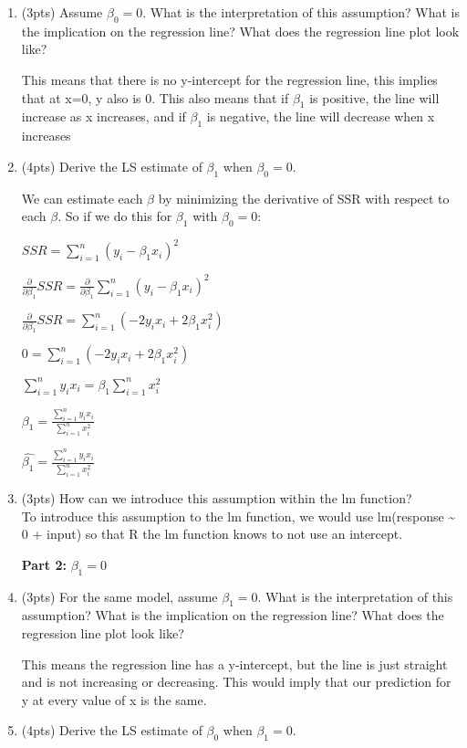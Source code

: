 \documentclass[
]{article}
\begin{document}
\begin{enumerate}
\def\labelenumi{(\alph{enumi})}
\item
  (3pts) Assume \(\beta_0=0\). What is the interpretation of this
  assumption? What is the implication on the regression line? What does
  the regression line plot look like?

  This means that there is no y-intercept for the regression line, this
  implies that at x=0, y also is 0. This also means that if \(\beta_1\)
  is positive, the line will increase as x increases, and if \(\beta_1\)
  is negative, the line will decrease when x increases
\item
  (4pts) Derive the LS estimate of \(\beta_1\) when \(\beta_0=0\).

  We can estimate each \(\beta\) by minimizing the derivative of SSR
  with respect to each \(\beta\). So if we do this for \(\beta_1\) with
  \(\beta_0=0\):

  \(SSR = \sum_{i=1}^{n}(y_i-\beta_1x_i)^2\)

  \(\frac{\partial}{\partial \beta_1} SSR = \frac{\partial}{\partial \beta_1} \sum_{i=1}^n(y_i-\beta_1x_i)^2\)

  \(\frac{\partial}{\partial \beta_1} SSR = \sum_{i=1}^n(-2y_ix_i+2\beta_1x_i^2)\)

  \(0=\sum_{i=1}^n(-2y_ix_i+2\beta_1x_i^2)\)

  \(\sum_{i=1}^ny_ix_i = \beta_1\sum_{i=1}^nx_i^2\)

  \(\beta_1 = \frac{\sum_{i=1}^ny_ix_i}{\sum_{i=1}^nx_i^2}\)

  \(\hat{\beta_1} = \frac{\sum_{i=1}^ny_ix_i}{\sum_{i=1}^nx_i^2}\)
\item
  (3pts) How can we introduce this assumption within the lm function?\\

  To introduce this assumption to the lm function, we would use
  lm(response \textasciitilde{} 0 + input) so that R the lm function
  knows to not use an intercept.

  \hfill\break
  \textbf{Part 2:} \(\beta_1=0\)\\
\item
  (3pts) For the same model, assume \(\beta_1=0\). What is the
  interpretation of this assumption? What is the implication on the
  regression line? What does the regression line plot look like?

  This means the regression line has a y-intercept, but the line is just
  straight and is not increasing or decreasing. This would imply that
  our prediction for y at every value of x is the same.
\item
  (4pts) Derive the LS estimate of \(\beta_0\) when \(\beta_1=0\).


\end{enumerate}
\end{document}
